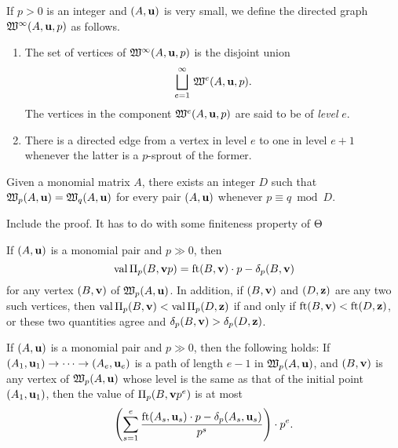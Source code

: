 \documentclass[11pt]{amsart}
\begin{document}
\begin{definition}
If $p > 0$ is an integer and $(A, \mathbf{u})$ is very small, we define the directed graph $\mathfrak{W}^{\infty}(A, \mathbf{u}, p)$ as follows.
\begin{enumerate}
\item  The set of vertices of $\mathfrak{W}^{\infty}(A, \mathbf{u}, p)$ is the disjoint union \[ \bigsqcup_{e=1}^{\infty} \, \mathfrak{W}^e(A, \mathbf{u}, p).\]
The vertices in the component $\mathfrak{W}^e(A, \mathbf{u}, p)$ are said to be of \emph{level} $e$.  
\item  There is a directed edge from a vertex in level $e$ to one in level $e+1$ whenever the latter is a $p$-sprout of the former.
\end{enumerate}
\end{definition}


\begin{proposition}
Given a monomial matrix $A$, there exists an integer $D$ such that $\mathfrak{W}_p(A, \mathbf{u}) = \mathfrak{W}_q(A, \mathbf{u})$ for every pair $(A, \mathbf{u})$ whenever $p \equiv q \bmod D$.
\end{proposition}

\alert[inline]{Include the proof.  It has to do with some finiteness property of $\Theta$}

\begin{corollary}
If $(A, \mathbf{u})$ is a monomial pair and $p \gg 0$, then
\[ \operatorname{val} \Pi_p(B, \mathbf{v}p) = \operatorname{ft}(B, \mathbf{v}) \cdot p - \delta_p(B, \mathbf{v}) \] for any vertex $(B, \mathbf{v})$ of $\mathfrak{W}_p(A, \mathbf{u})$.    In addition, if $(B, \mathbf{v})$ and $(D, \mathbf{z})$ are any two such vertices, then $\operatorname{val} \Pi_p(B, \mathbf{v}) < \operatorname{val} \Pi_p(D, \mathbf{z})$ if and only if $\operatorname{ft}(B, \mathbf{v}) < \operatorname{ft}(D, \mathbf{z})$, or these two quantities agree and $\delta_p(B, \mathbf{v}) > \delta_p(D, \mathbf{z})$.  
\end{corollary}


\begin{theorem}
If $(A, \mathbf{u})$ is a monomial pair and $p \gg 0$, then the following holds\textup:  If 
$(A_1, \mathbf{u}_1) \to \cdots \to (A_e, \mathbf{u}_e)$ is a path of length $e-1$ in $\mathfrak{W}_p(A, \mathbf{u})$, and $(B, \mathbf{v})$ is any vertex of $\mathfrak{W}_p(A, \mathbf{u})$ whose level is the same as that of the initial point $(A_1, \mathbf{u}_1)$, then the value of $\Pi_p(B, \mathbf{v}p^e)$ is at most 
%
 \[ \left( \sum_{s=1}^e \frac{ \operatorname{ft}(A_s, \mathbf{u}_s)  \cdot p - \delta_p(A_s, \mathbf{u}_s)}{p^s} \right) \cdot p^e. \] 
\end{theorem}
\end{document}
